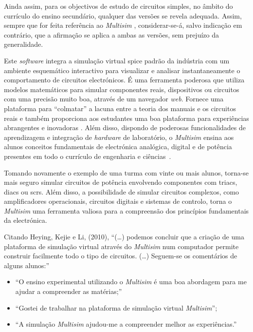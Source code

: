 Ainda assim, para os objectivos de estudo de circuitos simples, no âmbito do currículo do ensino secundário, qualquer das versões se revela adequada. Assim, sempre que for feita referência ao \textit{Multisim} \cite{multisim}, considerar-se-á, salvo indicação em contrário, que a afirmação se aplica a ambas as versões, sem prejuízo da generalidade.

Este \textit{software} integra a simulação virtual \acrfull{spice} padrão da indústria com um ambiente esquemático interactivo para visualizar e analisar instantaneamente o comportamento de circuitos electrónicos. É uma ferramenta poderosa que utiliza modelos matemáticos para simular componentes reais, dispositivos ou circuitos com uma precisão muito boa, através de um navegador \textit{web}. Fornece uma plataforma para ``colmatar'' a lacuna entre a teoria dos manuais e os circuitos reais e também proporciona aos estudantes uma boa plataforma para experiências abrangentes e inovadoras \cite{multisim}. Além disso, dispondo de poderosas funcionalidades de aprendizagem e integração de \textit{hardware} de laboratório, o \textit{Multisim} ensina aos alunos conceitos fundamentais de electrónica analógica, digital e de potência presentes em todo o currículo de engenharia e ciências~\cite{ImportantSimSoftware}.

Tomando novamente o exemplo de uma turma com vinte ou mais alunos, torna-se mais seguro simular circuitos de potência envolvendo componentes com \gls{triac}s, \gls{diac}s ou \gls{scr}s. Além disso, a possibilidade de simular circuitos complexos, como amplificadores operacionais, circuitos digitais e sistemas de controlo, torna o \textit{Multisim} uma ferramenta valiosa para a compreensão dos princípios fundamentais da electrónica.

Citando Heying, Kejie e Li, (2010), ``(\ldots) podemos concluir que a criação de uma plataforma de simulação virtual através do \textit{Multisim} num computador permite construir facilmente todo o tipo de circuitos. (\ldots) Seguem-se os comentários de alguns alunos:''
\begin{itemize}
    \item ``O ensino experimental utilizando o \textit{Multisim} é uma boa abordagem para me ajudar a compreender as matérias;''
    \item ``Gostei de trabalhar na plataforma de simulação virtual \textit{Multisim}'';
    \item ``A simulação \textit{Multisim} ajudou-me a compreender melhor as experiências.''
\end{itemize}

